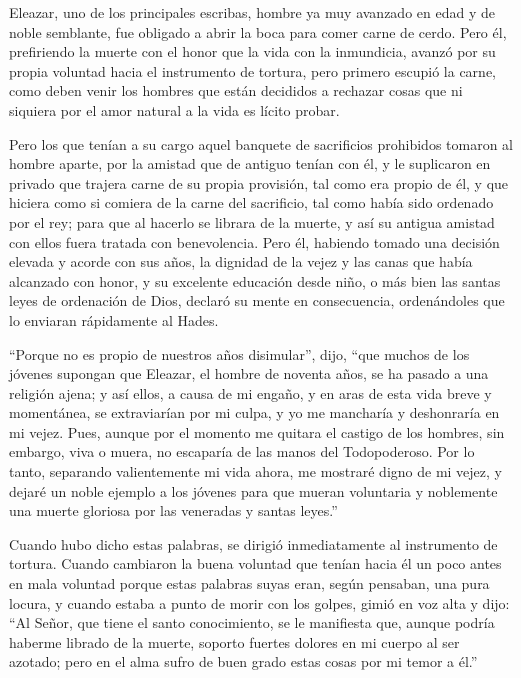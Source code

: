  Eleazar, uno de los principales escribas, hombre ya muy
avanzado en edad y de noble semblante, fue obligado a abrir la boca para
comer carne de cerdo.  Pero él, prefiriendo la muerte con
el honor que la vida con la inmundicia, avanzó por su propia voluntad
hacia el instrumento de tortura, pero primero escupió la carne,
 como deben venir los hombres que están decididos a
rechazar cosas que ni siquiera por el amor natural a la vida es lícito
probar.

 Pero los que tenían a su cargo aquel banquete de
sacrificios prohibidos tomaron al hombre aparte, por la amistad que de
antiguo tenían con él, y le suplicaron en privado que trajera carne de
su propia provisión, tal como era propio de él, y que hiciera como si
comiera de la carne del sacrificio, tal como había sido ordenado por el
rey;  para que al hacerlo se librara de la muerte, y así
su antigua amistad con ellos fuera tratada con benevolencia.
 Pero él, habiendo tomado una decisión elevada y acorde
con sus años, la dignidad de la vejez y las canas que había alcanzado
con honor, y su excelente educación desde niño, o más bien las santas
leyes de ordenación de Dios, declaró su mente en consecuencia,
ordenándoles que lo enviaran rápidamente al Hades.

 ``Porque no es propio de nuestros años disimular'',
dijo, ``que muchos de los jóvenes supongan que Eleazar, el hombre de
noventa años, se ha pasado a una religión ajena;  y así
ellos, a causa de mi engaño, y en aras de esta vida breve y momentánea,
se extraviarían por mi culpa, y yo me mancharía y deshonraría en mi
vejez.  Pues, aunque por el momento me quitara el castigo
de los hombres, sin embargo, viva o muera, no escaparía de las manos del
Todopoderoso.  Por lo tanto, separando valientemente mi
vida ahora, me mostraré digno de mi vejez,  y dejaré un
noble ejemplo a los jóvenes para que mueran voluntaria y noblemente una
muerte gloriosa por las veneradas y santas leyes.''

Cuando hubo dicho estas palabras, se dirigió inmediatamente al
instrumento de tortura.  Cuando cambiaron la buena
voluntad que tenían hacia él un poco antes en mala voluntad porque estas
palabras suyas eran, según pensaban, una pura locura,  y
cuando estaba a punto de morir con los golpes, gimió en voz alta y dijo:
``Al Señor, que tiene el santo conocimiento, se le manifiesta que,
aunque podría haberme librado de la muerte, soporto fuertes dolores en
mi cuerpo al ser azotado; pero en el alma sufro de buen grado estas
cosas por mi temor a él.''

